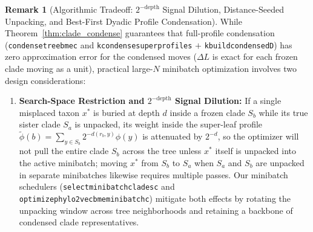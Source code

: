 \documentclass[11pt,a4paper]{article}
\makeatletter
\DeclareRobustCommand{\_}{\ifmmode\nfss@text{\textunderscore}\else\textunderscore\allowbreak\fi}
\theoremstyle{definition}
\newtheorem{remark}[theorem]{Remark}
\makeatother
\begin{document}
\begin{remark}[Algorithmic Tradeoff: $2^{-\text{depth}}$ Signal Dilution, Distance-Seeded Unpacking, and Best-First Dyadic Profile Condensation]
\label{rem:minibatch_tradeoffs}
While Theorem~\ref{thm:clade_condense} guarantees that full-profile condensation (\texttt{condense\_tree\_bme\_c} and \texttt{k\_condense\_super\_profiles} $+$ \texttt{k\_build\_condensed\_D}) has zero approximation error for the condensed moves ($\Delta L$ is exact for each frozen clade moving as a unit), practical large-$N$ minibatch optimization involves two design considerations:
\begin{enumerate}
    \item \textbf{Search-Space Restriction and $2^{-\text{depth}}$ Signal Dilution:} If a single misplaced taxon $x^*$ is buried at depth $d$ inside a frozen clade $S_b$ while its true sister clade $S_a$ is unpacked, its weight inside the super-leaf profile $\widetilde{\phi}(b) = \sum_{y \in S_b} 2^{-d(r_b, y)} \phi(y)$ is attenuated by $2^{-d}$, so the optimizer will not pull the entire clade $S_b$ across the tree unless $x^*$ itself is unpacked into the active minibatch; moving $x^*$ from $S_b$ to $S_a$ when $S_a$ and $S_b$ are unpacked in separate minibatches likewise requires multiple passes. Our minibatch schedulers (\texttt{select\_minibatch\_clades\_c} and \texttt{optimize\_phylo2vec\_bme\_minibatch\_c}) mitigate both effects by rotating the unpacking window across tree neighborhoods and retaining a backbone of condensed clade representatives.

\end{enumerate}
\end{remark}
\end{document}
